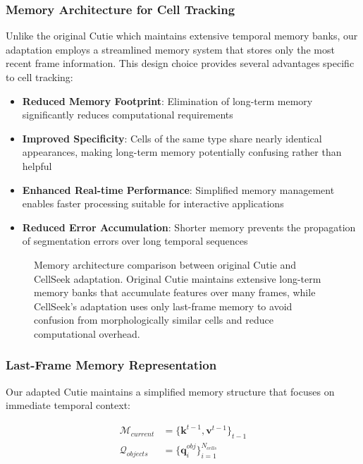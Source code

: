 \documentclass[../cellseek_paper.tex]{subfiles}
\begin{document}
\subsubsection{Memory Architecture for Cell Tracking}

Unlike the original Cutie which maintains extensive temporal memory banks, our adaptation employs a streamlined memory system that stores only the most recent frame information. This design choice provides several advantages specific to cell tracking:

\begin{itemize}
  \item \textbf{Reduced Memory Footprint}: Elimination of long-term memory significantly reduces computational requirements
  \item \textbf{Improved Specificity}: Cells of the same type share nearly identical appearances, making long-term memory potentially confusing rather than helpful
  \item \textbf{Enhanced Real-time Performance}: Simplified memory management enables faster processing suitable for interactive applications
  \item \textbf{Reduced Error Accumulation}: Shorter memory prevents the propagation of segmentation errors over long temporal sequences
\end{itemize}

\begin{figure}[H]
  \centering
  
  \caption{Memory architecture comparison between original Cutie and CellSeek adaptation. Original Cutie maintains extensive long-term memory banks that accumulate features over many frames, while CellSeek's adaptation uses only last-frame memory to avoid confusion from morphologically similar cells and reduce computational overhead.}
  \label{fig:memory_comparison}
\end{figure}

\subsubsection{Last-Frame Memory Representation}

Our adapted Cutie maintains a simplified memory structure that focuses on immediate temporal context:

\begin{align}
  \mathcal{M}_{current} & = \{\mathbf{k}^{t-1}, \mathbf{v}^{t-1}\}_{t-1} \\
  \mathcal{Q}_{objects} & = \{\mathbf{q}_i^{obj}\}_{i=1}^{N_{cells}}
\end{align}
\end{document}
